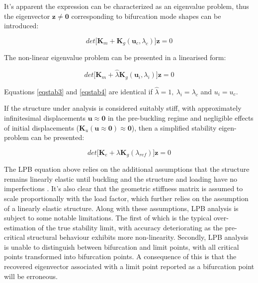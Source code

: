 It's apparent the expression can be characterized as an eigenvalue problem, thus the eigenvector $\mathbf{z} \neq \mathbf{0}$ corresponding to bifurcation mode shapes can be introduced:

\begin{equation} 
det\big[
\mathbf{K}_m +
\mathbf{K}_g(\mathbf{u}_c,\lambda_c)
\big]\mathbf{z} = 0
\label{eqstab3}
\end{equation}

The non-linear eigenvalue problem can be presented in a linearised form:

\begin{equation} 
det\big[
\mathbf{K}_m +
\hat{\lambda}
\mathbf{K}_g(\mathbf{u}_i,\lambda_i)
\big]\mathbf{z} = 0
\label{eqstab4}
\end{equation}

Equations \ref{eqstab3} and \ref{eqstab4} are identical if $\hat{\lambda}
 = 1,\ \lambda_i = \lambda_c$ and $u_i = u_c$.
 
 If the structure under analysis is considered suitably stiff, with approximately infinitesimal displacements $\mathbf{u} \approx \mathbf{0}$ in the pre-buckling regime and negligible effects of initial displacements ($\mathbf{K}_u(\mathbf{u} \approx \mathbf{0}) \approx \mathbf{0}$), then a simplified stability eigen-problem can be presented:
 
 \begin{equation} 
 det\big[
 \mathbf{K}_e +
{\lambda}
 \mathbf{K}_g(\lambda_{ref})
 \big]\mathbf{z} = 0
 \label{eqstab5}
 \end{equation}
 
 The LPB equation above relies on the additional assumptions that the structure remains linearly elastic until buckling and the structure and loading have no imperfections \cite{FelippaStabilityBasics2016}. It's also clear that the geometric stiffness matrix is assumed to scale proportionally with the load factor, which further relies on the assumption of a linearly elastic structure. Along with these assumptions, LPB analysis is subject to some notable limitations. The first of which is the typical over-estimation of the true stability limit, with accuracy deteriorating as the pre-critical structural behaviour exhibits more non-linearity. Secondly, LPB analysis is unable to distinguish between bifurcation and limit points, with all critical points transformed into bifurcation points. A consequence of this is that the recovered eigenvector associated with a limit point reported as a bifurcation point will be erroneous.
 
